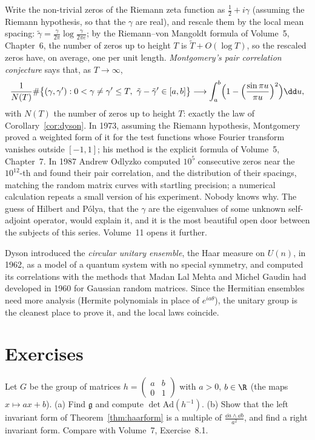 \begin{beauty}
Write the non-trivial zeros of the Riemann zeta function as $\frac12+i\gamma$ (assuming the Riemann hypothesis, so that the $\gamma$ are real), and rescale them by the local mean spacing:
$\tilde\gamma=\frac\gamma{2\pi}\log\frac\gamma{2\pi e}$; by the Riemann--von Mangoldt formula of Volume~5, Chapter~6, the number of zeros up to height $T$ is $\tilde T+O(\log T)$, so the rescaled zeros have, on average, one per unit length. \emph{Montgomery's pair correlation
conjecture} says that, as $T\to\infty$,
\[\frac1{N(T)}\#\bigl\{(\gamma,\gamma'):0<\gamma\neq\gamma'\le T,\ \tilde\gamma-\tilde\gamma'\in[a,b]\bigr\}\longrightarrow\int_a^b\Bigl(1-\Bigl(\frac{\sin\pi u}{\pi u}\Bigr)^2\Bigr)\dd u,\]
with $N(T)$ the number of zeros up to height $T$: exactly the law of Corollary~\ref{cor:dyson}. In 1973, assuming the Riemann hypothesis, Montgomery proved a weighted form of it for the test functions
whose Fourier transform vanishes outside $[-1,1]$; his method is the explicit formula of Volume~5, Chapter~7. In 1987 Andrew Odlyzko computed $10^5$ consecutive zeros near the $10^{12}$-th and found
their pair correlation, and the distribution of their spacings, matching the random matrix curves with startling precision; a numerical calculation repeats a small version of his
experiment. Nobody knows why. The guess of Hilbert and P\'olya, that the $\gamma$ are the eigenvalues of some unknown self-adjoint operator, would explain it, and it is the most beautiful open
door between the subjects of this series. Volume~11 opens it further.
\end{beauty}

\begin{remark}
Dyson introduced the \emph{circular unitary ensemble}, the Haar measure on $U(n)$, in 1962, as a model of a quantum system with no special symmetry, and computed its correlations with the methods that Madan Lal Mehta and Michel Gaudin had developed in 1960 for Gaussian random matrices. Since the Hermitian ensembles need more analysis (Hermite polynomials in
place of $e^{ia\theta}$), the unitary group is the cleanest place to prove it, and the local laws coincide.
\end{remark}

\section{Exercises}

\begin{exercise}[$\star$]\label{ex:axbmodular}
Let $G$ be the group of matrices $h=\begin{pmatrix}a&b\\0&1\end{pmatrix}$ with $a>0$, $b\in\R$ (the maps $x\mapsto ax+b$). (a) Find $\mathfrak g$ and compute $\det\mathrm{Ad}(h^{-1})$. (b) Show that the left
invariant form of Theorem~\ref{thm:haarform} is a multiple of $\frac{\dd a\wedge\dd b}{a^2}$, and find a right invariant form. Compare with Volume~7, Exercise~8.1.
\end{exercise}

